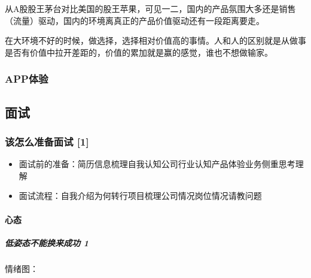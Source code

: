 \documentclass[letterpaper,10pt,english]{sphinxmanual}
\begin{document}
从A股股王茅台对比美国的股王苹果，可见一二，国内的产品氛围大多还是销售（流量）驱动，国内的环境离真正的产品价值驱动还有一段距离要走。

在大环境不好的时候，做选择，选择相对价值高的事情。人和人的区别就是从做事是否有价值中拉开差距的，价值的累加就是赢的感觉，谁也不想做输家。


\subsubsection{APP体验}
\label{\detokenize{chapter_project/APP_experience:app}}\label{\detokenize{chapter_project/APP_experience::doc}}

\subsection{面试}
\label{\detokenize{chapter_interview/index:chap-interview}}\label{\detokenize{chapter_interview/index:id1}}\label{\detokenize{chapter_interview/index::doc}}

\subsubsection{该怎么准备面试 {[}1{]}}
\label{\detokenize{chapter_interview/index:id2}}\begin{itemize}
\item {} 
面试前的准备：简历信息梳理\sphinxhyphen{}自我认知\sphinxhyphen{}公司行业认知\sphinxhyphen{}产品体验\sphinxhyphen{}业务侧重思考理解

\item {} 
面试流程：自我介绍\sphinxhyphen{}为何转行\sphinxhyphen{}项目梳理\sphinxhyphen{}公司情况\sphinxhyphen{}岗位情况\sphinxhyphen{}请教问题

\end{itemize}


\paragraph{心态}
\label{\detokenize{chapter_interview/xintai:id1}}\label{\detokenize{chapter_interview/xintai::doc}}

\subparagraph{低姿态不能换来成功 1\sphinxfootnotemark[827]}
\label{\detokenize{chapter_interview/xintai:id2}}%
\begin{footnotetext}[827]\sphinxAtStartFootnote
{}
%
\end{footnotetext}\ignorespaces 
情绪图：
\end{document}
